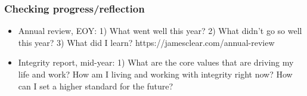 \begin{frame}[fragile]\frametitle{Checking progress/reflection}
\begin{itemize}
\item Annual review, EOY: 1) What went well this year? 2) What didn't go so well this year? 3) What did I learn? https://jamesclear.com/annual-review 
\item Integrity report, mid-year: 1) What are the core values that are driving my life and work? How am I living and working with integrity right now? How can I set a higher standard for the future? 
\end{itemize}
\end{frame}


